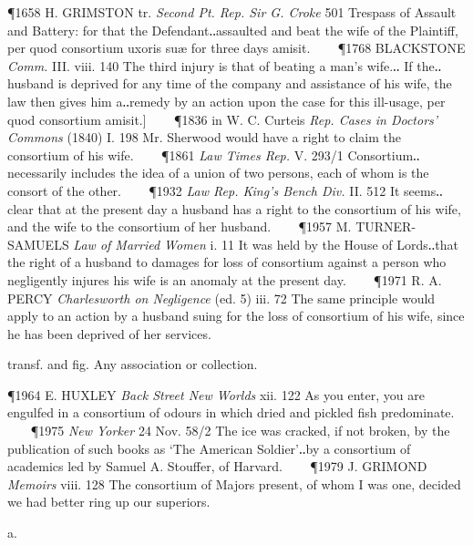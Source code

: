 \begin{description}[wide, labelwidth=!, labelindent=0pt]
\begin{myenumerate}
\P 1658 H. GRIMSTON  tr. \textit{Second Pt. Rep. Sir G. Croke} 501 Trespass of Assault and Battery: for that the Defendant‥assaulted and beat the wife of the Plaintiff, per quod consortium uxoris suæ for three days amisit.    
\P 1768 BLACKSTONE  \textit{Comm.} III. viii. 140 The third injury is that of beating a man's wife.‥ If the‥husband is deprived for any time of the company and assistance of his wife, the law then gives him a‥remedy by an action upon the case for this ill-usage, per quod consortium amisit.]    
\P 1836 in  W. C. Curteis \textit{Rep. Cases in Doctors' Commons} (1840) I. 198 Mr. Sherwood would have a right to claim the consortium of his wife.    
\P 1861 \textit{Law  Times Rep.} V. 293/1 Consortium‥necessarily includes the idea of a union of two persons, each of whom is the consort of the other.    
\P 1932 \textit{Law  Rep. King's Bench Div.} II. 512 It seems‥clear that at the present day a husband has a right to the consortium of his wife, and the wife to the consortium of her husband.    
\P 1957 M. TURNER-SAMUELS  \textit{Law of Married Women} i. 11 It was held by the House of Lords‥that the right of a husband to damages for loss of consortium against a person who negligently injures his wife is an anomaly at the present day.    
\P 1971 R. A. PERCY  \textit{Charlesworth on Negligence} (ed. 5) iii. 72 The same principle would apply to an action by a husband suing for the loss of consortium of his wife, since he has been deprived of her services.

 transf. and fig. Any association or collection.

\P 1964 E. HUXLEY  \textit{Back Street New Worlds} xii. 122 As you enter, you are engulfed in a consortium of odours in which dried and pickled fish predominate.    
\P 1975  \textit{New Yorker} 24 Nov. 58/2 The ice was cracked, if not broken, by the publication of such books as ‘The American Soldier’‥by a consortium of academics led by Samuel A. Stouffer, of Harvard.    
\P 1979 J. GRIMOND  \textit{Memoirs} viii. 128 The consortium of Majors present, of whom I was one, decided we had better ring up our superiors.
\end{myenumerate}


 a.

\noindent {}

\vspace{-0.3cm}


\end{description}
